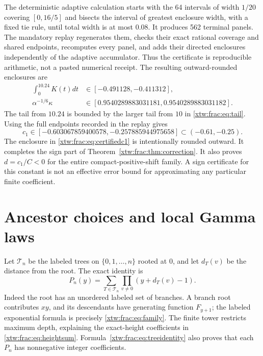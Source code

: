 \documentclass[11pt]{article}
\theoremstyle{remark}\newtheorem{remark}[theorem]{Remark}
\begin{document}
The deterministic adaptive calculation starts with the 64 intervals of
width $1/20$ covering $[0,16/5]$ and bisects the interval of greatest
enclosure width, with a fixed tie rule, until total width is at most
$0.08$. It produces 562 terminal panels. The mandatory replay regenerates
them, checks their exact rational coverage and shared endpoints, recomputes
every panel, and adds their directed enclosures independently of the
adaptive accumulator. Thus the certificate is reproducible arithmetic,
not a pasted numerical receipt.
The resulting outward-rounded enclosures are
\begin{align}
 \int_0^{10.24}K(t)dt&\in[-0.491128,-0.411312],\label{xtw:frac:eq:corebracket}\\
 \alpha^{-1/6}\kappa&\in[0.9540289883031181,0.9540289883031182].
                                                        \label{xtw:frac:eq:prefactorbracket}
\end{align}
The tail from $10.24$ is bounded by the larger tail from $10$ in
\eqref{xtw:frac:eq:tail}. Using the full endpoints recorded in the replay gives
\begin{equation}\label{xtw:frac:eq:certifiedc1}
 c_1\in[-0.603067859400578,-0.257885944975658]
                    \subset(-0.61,-0.25).
\end{equation}
The enclosure in \eqref{xtw:frac:eq:certifiedc1} is intentionally rounded outward.
It completes the sign part of Theorem~\ref{xtw:frac:thm:correction}. It also proves
$d=c_1/C<0$ for the entire compact-positive-shift family.
A sign certificate for this constant is not an effective error bound for
approximating any particular finite coefficient.

\section{Ancestor choices and local Gamma laws}\label{xtw:frac:sec:ancestor}
Let $\mathcal T_n$ be the labeled trees on $\{0,1,\ldots,n\}$ rooted at
$0$, and let $d_T(v)$ be the distance from the root. The exact identity is
\begin{equation}\label{xtw:frac:eq:treeidentity}
 P_n(y)=\sum_{T\in\mathcal T_n}\prod_{v\ne0}(y+d_T(v)-1).
\end{equation}
Indeed the root has an unordered labeled set of branches. A branch root
contributes $xy$, and its descendants have generating function $F_{y+1}$;
the labeled exponential formula is precisely \eqref{xtw:frac:eq:family}.
The finite tower restricts maximum depth, explaining the exact-height
coefficients in \eqref{xtw:frac:eq:heightsum}. Formula~\eqref{xtw:frac:eq:treeidentity}
also proves that each $P_n$ has nonnegative integer coefficients.
\end{document}
